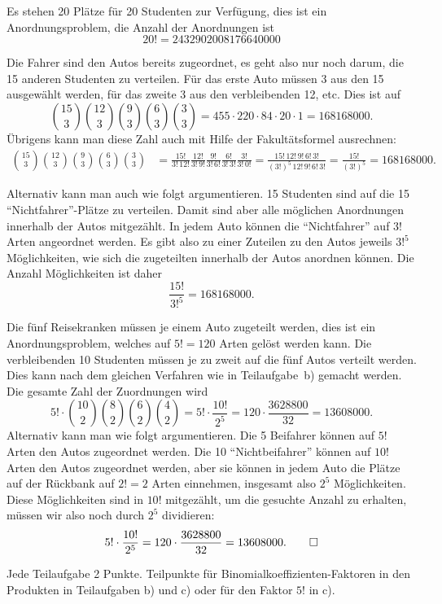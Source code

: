 \begin{loesung}
\begin{teilaufgaben}
\item
Es stehen 20 Plätze für 20 Studenten zur Verfügung, dies ist ein
Anordnungsproblem, die Anzahl der Anordnungen ist
\[
20!
=
2432902008176640000
\]
\item
Die Fahrer sind den Autos bereits zugeordnet, es geht also nur noch darum,
die 15 anderen Studenten zu verteilen.
Für das erste Auto müssen 3 aus den 15 ausgewählt werden, für das zweite
3 aus den verbleibenden 12, etc.
Dies ist auf
\[
\binom{15}{3}
\binom{12}{3}
\binom{9}{3}
\binom{6}{3}
\binom{3}{3}
=
455\cdot 220\cdot 84 \cdot 20\cdot 1
=
168168000.
\]
Übrigens kann man diese Zahl auch mit Hilfe der Fakultätsformel ausrechnen:
\begin{align*}
\binom{15}{3}
\binom{12}{3}
\binom{9}{3}
\binom{6}{3}
\binom{3}{3}
&=
\frac{15!}{3!\,12!}
\frac{12!}{3!\,9!}
\frac{9!}{3!\,6!}
\frac{6!}{3!\,3!}
\frac{3!}{3!\,0!}
=
\frac{15!\,12!\,9!\,6!\,3!}{(3!)^5\,12!\,9!\,6!\,3!}
=
\frac{15!}{(3!)^5}
=
168168000.
\end{align*}

Alternativ kann man auch wie folgt argumentieren.
15 Studenten sind auf die 15 ``Nichtfahrer''-Plätze zu verteilen.
Damit sind aber alle möglichen Anordnungen innerhalb der Autos mitgezählt.
In jedem Auto können die ``Nichtfahrer'' auf $3!$ Arten angeordnet werden.
Es gibt also zu einer Zuteilen zu den Autos jeweils $3!^5$ Möglichkeiten,
wie sich die zugeteilten innerhalb der Autos anordnen können.
Die Anzahl Möglichkeiten ist daher
\[
\frac{15!}{3!^5}
=
168168000.
\]
\item
Die fünf Reisekranken müssen je einem Auto zugeteilt werden, dies ist
ein Anordnungsproblem, welches auf $5!=120$ Arten gelöst werden kann.
Die verbleibenden 10 Studenten müssen je zu zweit auf die fünf Autos 
verteilt werden. Dies kann nach dem gleichen Verfahren wie in
Teilaufgabe~b) gemacht werden.
Die gesamte Zahl der Zuordnungen wird
\[
5!\cdot
\binom{10}{2}
\binom{8}{2}
\binom{6}{2}
\binom{4}{2}
=
5!\cdot
\frac{10!}{2^5}
=
120\cdot\frac{3628800}{32}
=
13608000.
\]
Alternativ kann man wie folgt argumentieren.
Die 5 Beifahrer können auf $5!$ Arten den Autos zugeordnet werden.
Die 10 ``Nichtbeifahrer'' können auf $10!$ Arten den Autos zugeordnet
werden, aber sie können in jedem Auto die Plätze auf der Rückbank auf
$2!=2$ Arten einnehmen, insgesamt also $2^5$ Möglichkeiten.
Diese Möglichkeiten sind in $10!$ mitgezählt, um die gesuchte Anzahl
zu erhalten, müssen wir also noch durch $2^5$ dividieren:
\[
5!\cdot
\frac{10!}{2^5}
=
120\cdot\frac{3628800}{32}
=
13608000.
\qedhere
\]
\end{teilaufgaben}
\end{loesung}

\begin{bewertung}
Jede Teilaufgabe 2 Punkte.
Teilpunkte für Binomialkoeffizienten-Faktoren in den Produkten in Teilaufgaben 
b) und c) oder für den Faktor $5!$ in c).
\end{bewertung}
